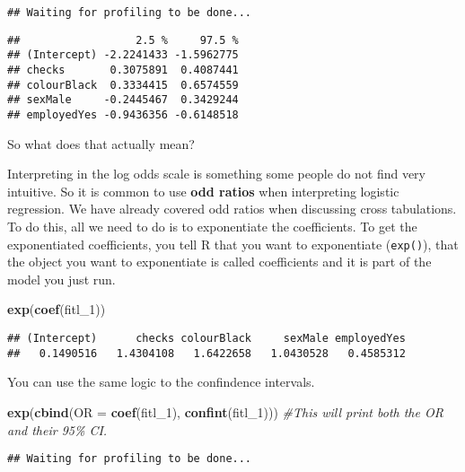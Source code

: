\documentclass[
]{book}
\newenvironment{Shaded}{\begin{snugshade}}{\end{snugshade}}
\newcommand{\AttributeTok}[1]{\textcolor[rgb]{0.13,0.29,0.53}{#1}}
\newcommand{\CommentTok}[1]{\textcolor[rgb]{0.56,0.35,0.01}{\textit{#1}}}
\newcommand{\FunctionTok}[1]{\textcolor[rgb]{0.13,0.29,0.53}{\textbf{#1}}}
\newcommand{\NormalTok}[1]{#1}
\begin{document}
\begin{verbatim}
## Waiting for profiling to be done...
\end{verbatim}

\begin{verbatim}
##                  2.5 %     97.5 %
## (Intercept) -2.2241433 -1.5962775
## checks       0.3075891  0.4087441
## colourBlack  0.3334415  0.6574559
## sexMale     -0.2445467  0.3429244
## employedYes -0.9436356 -0.6148518
\end{verbatim}

So what does that actually mean?

Interpreting in the log odds scale is something some people do not find very intuitive. So it is common to use \textbf{odd ratios} when interpreting logistic regression. We have already covered odd ratios when discussing cross tabulations. To do this, all we need to do is to exponentiate the coefficients. To get the exponentiated coefficients, you tell R that you want to exponentiate (\texttt{exp()}), that the object you want to exponentiate is called coefficients and it is part of the model you just run.

\begin{Shaded}
\begin{Highlighting}[]
\FunctionTok{exp}\NormalTok{(}\FunctionTok{coef}\NormalTok{(fitl\_1))}
\end{Highlighting}
\end{Shaded}

\begin{verbatim}
## (Intercept)      checks colourBlack     sexMale employedYes 
##   0.1490516   1.4304108   1.6422658   1.0430528   0.4585312
\end{verbatim}

You can use the same logic to the confindence intervals.

\begin{Shaded}
\begin{Highlighting}[]
\FunctionTok{exp}\NormalTok{(}\FunctionTok{cbind}\NormalTok{(}\AttributeTok{OR =} \FunctionTok{coef}\NormalTok{(fitl\_1), }\FunctionTok{confint}\NormalTok{(fitl\_1))) }\CommentTok{\#This will print both the OR and their 95\% CI.}
\end{Highlighting}
\end{Shaded}

\begin{verbatim}
## Waiting for profiling to be done...
\end{verbatim}
\end{document}
